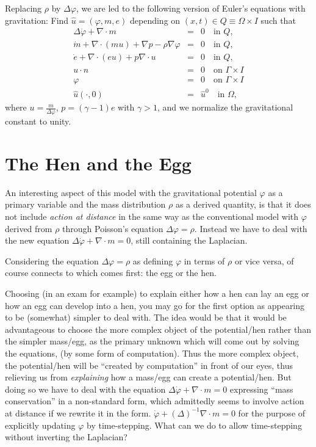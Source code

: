 Replacing $\rho$ by $\Delta\varphi$, we are led to the following version
of Euler's equations with gravitation:  
Find $\hat u=(\varphi ,m,e)$ 
depending on $(x,t)\in Q\equiv \Omega\times I$ such that
\begin{equation}\label{eulergrav}
\begin{array}{rcl}
\Delta\dot\varphi +\nabla\cdot m &=&  0 \quad \mbox{in } Q, \\
\dot m +\nabla\cdot (mu) +\nabla p-\rho\nabla\varphi&=&  0 \quad \mbox{in } Q, \\
\dot e +\nabla\cdot (eu)+p\nabla\cdot u &=& 0  \quad \mbox{in } Q,\\ 
u\cdot n&=&0\quad \mbox{on } \Gamma\times I\\
\varphi &=&0\quad \mbox{on } \Gamma\times I\\
\hat u(\cdot ,0)&=&\hat u^0\quad \mbox{in } \Omega , 
\end{array} 
\end{equation}
where $u=\frac{m}{\Delta\varphi}$, 
$p=(\gamma -1)e$ with $\gamma >1$, and we normalize the gravitational
constant to unity.

\section{The Hen and the Egg}

An interesting aspect of this model with the gravitational
potential $\varphi$ as a primary variable and the mass distribution
$\rho$ as a derived quantity, is that it does not include
\emph{action at distance} in the same way as the conventional model
with $\varphi$ derived from $\rho$ through Poisson's equation 
$\Delta\varphi =\rho$. Instead we have to deal
with the new equation $\Delta\dot\varphi +\nabla\cdot m =0$,
still containing the Laplacian.

Considering the equation $\Delta\varphi =\rho$ as defining
$\varphi$ in terms of $\rho$ or vice versa, of course connects
to which comes first: the egg or the hen. 

Choosing (in an exam for example) 
to explain either how a hen can lay an egg
or how an egg can develop into a hen, you may go for the first
option as appearing to be (somewhat) simpler to deal with.
The idea would be that it would be advantageous to
choose the more complex object of the 
potential/hen rather than the simpler mass/egg, as 
the primary unknown which will come out by solving the equations,
(by some form of computation).
Thus the more complex object, the potential/hen will 
be ``created by computation'' in front of our eyes, thus relieving us
from \emph{explaining} how a mass/egg can create a potential/hen. 
But doing so we have to deal with 
the equation $\Delta\dot\varphi +\nabla\cdot m=0$
expressing ``mass conservation'' in a non-standard form,
which  admittedly seems to involve action at distance if we rewrite it in the form.
$\dot\varphi +(\Delta )^{-1}\nabla\cdot m=0$ for the purpose
of explicitly updating $\varphi$ by time-stepping. What can we do 
to allow time-stepping without inverting the Laplacian?

